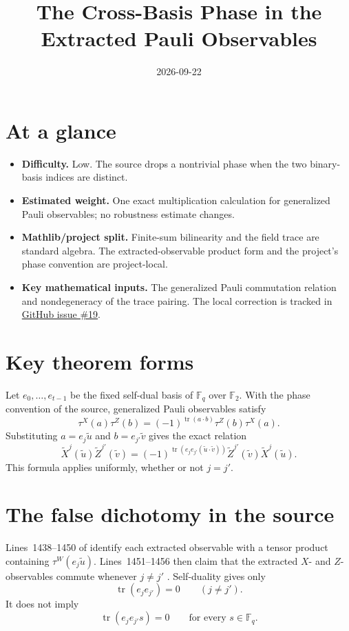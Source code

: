 \documentclass[11pt]{article}
\title{The Cross-Basis Phase in the Extracted Pauli Observables}
\author{}
\date{2026-09-22}
\renewcommand{\ghissue}[1]{%
  \href{https://github.com/Dengnifer/MIPStarRE-QPBT/issues/#1}{GitHub issue \##1}}
\begin{document}
\maketitle

\section{At a glance}

\begin{itemize}
  \item \textbf{Difficulty.} Low.  The source drops a nontrivial phase when the
  two binary-basis indices are distinct.
  \item \textbf{Estimated weight.} One exact multiplication calculation for
  generalized Pauli observables; no robustness estimate changes.
  \item \textbf{Mathlib/project split.} Finite-sum bilinearity and the field
  trace are standard algebra.  The extracted-observable product form and the
  project's phase convention are project-local.
  \item \textbf{Key mathematical inputs.} The generalized Pauli commutation
  relation and nondegeneracy of the trace pairing.  The local correction is
  tracked in \ghissue{19}.
\end{itemize}

\section{Key theorem forms}

Let $e_0,\ldots,e_{t-1}$ be the fixed self-dual basis of $\mathbb F_q$ over
$\mathbb F_2$.  With the phase convention of the source, generalized Pauli
observables satisfy
\[
  \tau^X(a)\tau^Z(b)
  =(-1)^{\operatorname{tr}(a\mathbin{\cdot}b)}
   \tau^Z(b)\tau^X(a).
\]
Substituting $a=e_j\widetilde u$ and $b=e_{j'}\widetilde v$ gives the exact
relation
\[
  \widetilde X^j(\widetilde u)\widetilde Z^{j'}(\widetilde v)
  =(-1)^{\operatorname{tr}
      (e_je_{j'}(\widetilde u\mathbin{\cdot}\widetilde v))}
   \widetilde Z^{j'}(\widetilde v)\widetilde X^j(\widetilde u).
\]
This formula applies uniformly, whether or not $j=j'$.

\section{The false dichotomy in the source}

Lines~1438--1450 of
identify each extracted observable with a tensor product containing
$\tau^W(e_j\widetilde u)$.  Lines~1451--1456 then claim that the extracted
$X$- and $Z$-observables commute whenever $j\neq j'$
\cite[lines~1438--1456]{Ji2020MIPStar}.  Self-duality gives only
\[
  \operatorname{tr}(e_je_{j'})=0 \qquad (j\neq j').
\]
It does not imply
\[
  \operatorname{tr}(e_je_{j'}s)=0
  \qquad\text{for every }s\in\mathbb F_q.
\]
\end{document}
